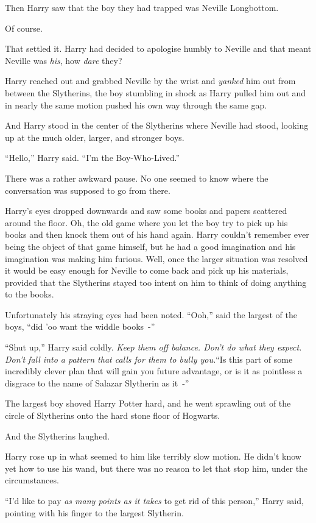 Then Harry saw that the boy they had trapped was Neville Longbottom.

Of course.

That settled it. Harry had decided to apologise humbly to Neville and that meant Neville was \emph{his}, how \emph{dare} they?

Harry reached out and grabbed Neville by the wrist and \emph{yanked} him out from between the Slytherins, the boy stumbling in shock as Harry pulled him out and in nearly the same motion pushed his own way through the same gap.

And Harry stood in the center of the Slytherins where Neville had stood, looking up at the much older, larger, and stronger boys.

``Hello,'' Harry said. ``I'm the Boy-Who-Lived.''

There was a rather awkward pause. No one seemed to know where the conversation was supposed to go from there.

Harry's eyes dropped downwards and saw some books and papers scattered around the floor. Oh, the old game where you let the boy try to pick up his books and then knock them out of his hand again. Harry couldn't remember ever being the object of that game himself, but he had a good imagination and his imagination was making him furious. Well, once the larger situation was resolved it would be easy enough for Neville to come back and pick up his materials, provided that the Slytherins stayed too intent on him to think of doing anything to the books.

Unfortunately his straying eyes had been noted. ``Ooh,'' said the largest of the boys, ``did 'oo want the widdle books~-''

``Shut up,'' Harry said coldly. \emph{Keep them off balance. Don't do what they expect. Don't fall into a pattern that calls for them to bully you.}``Is this part of some incredibly clever plan that will gain you future advantage, or is it as pointless a disgrace to the name of Salazar Slytherin as it~-''

The largest boy shoved Harry Potter hard, and he went sprawling out of the circle of Slytherins onto the hard stone floor of Hogwarts.

And the Slytherins laughed.

Harry rose up in what seemed to him like terribly slow motion. He didn't know yet how to use his wand, but there was no reason to let that stop him, under the circumstances.

``I'd like to pay \emph{as many points as it takes} to get rid of this person,'' Harry said, pointing with his finger to the largest Slytherin.

